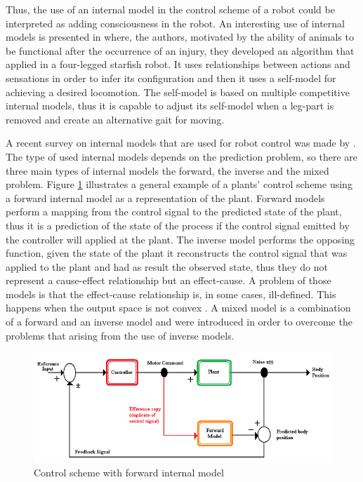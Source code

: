 \documentclass[msc,ai,logo]{infthesis}
\begin{document}
 Thus, the use of an internal model in the control scheme of a robot could be interpreted as adding consciousness in the robot. An interesting use of internal models is presented in \cite{Bongard2006} 
where, the authors, motivated by the ability of animals to be functional after the occurrence of an injury, they developed an algorithm that applied in a four-legged starfish robot. It uses relationships between actions and sensations in order to infer its configuration and then it uses a self-model for achieving a desired locomotion. The self-model is based on multiple competitive internal models, thus it is capable to adjust its self-model when a leg-part is removed and create an alternative gait for moving. 
 
A recent survey on internal models that are used for robot control was made by \cite{Nguyen-Tuong2011}. The type of used internal models depends on the prediction problem, so there are three main types of internal models the forward, the inverse and the mixed problem.
Figure \ref{fig:im} illustrates a general example of a plants' control scheme using a forward internal model as a representation of the plant. Forward models perform a mapping from the control signal to the predicted state of the plant, thus it is a prediction of the state of the process if the control signal emitted by the controller will applied at the plant. The inverse model performs the opposing function, given the state of the plant it reconstructs the control signal that was applied to the plant and had as result the observed state, thus they do not represent a cause-effect relationship but an effect-cause. A problem of those models is that the effect-cause relationship is, in some cases, ill-defined. This happens when the output space is not convex \citep{COGS:COGS236}. A mixed model is a combination of a forward and an inverse model and were introduced in order to overcome the problems that arising from the use of inverse models. 
 
 \begin{figure}
\includegraphics[scale=0.6]{im.png}
\centering
\caption{Control scheme with forward internal model}
\label{fig:im}
\end{figure}
\end{document}
